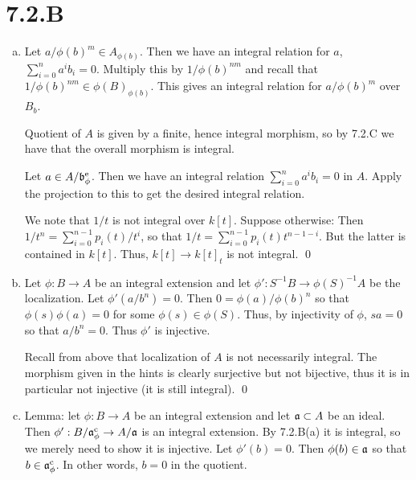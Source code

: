 \documentclass{article}
\begin{document}
\section{7.2.B}
\begin{enumerate}[a.]
    \item Let $a/\phi(b)^m \in A_{\phi(b)}$. Then we have an integral relation
          for $a$, $\sum_{i=0}^n a^ib_i=0$. Multiply this by $1/\phi(b)^{nm}$
          and recall
          that $1/\phi(b)^{nm} \in \phi(B)_{\phi(b)}$. This gives an integral
          relation
          for $a/\phi(b)^m$ over $B_b$.

          Quotient of $A$ is given by a finite, hence integral morphism, so by
          7.2.C we have that the overall morphism is integral.

          Let $a \in A/\mathfrak{b}^{\text{e}}_{\phi}$. Then we have an integral
          relation $\sum_{i=0}^n a^ib_i=0$ in $A$. Apply the projection to this
          to get
          the desired integral relation.

          We note that $1/t$ is not integral over $k[t]$. Suppose otherwise:
          Then $1/t^n=\sum_{i=0}^{n-1} p_i(t)/t^i$, so that
          $1/t=\sum_{i=0}^{n-1}
              p_i(t)t^{n-1-i}$. But the latter is contained in $k[t]$. Thus,
          $k[t] \to
              k[t]_t$ is not integral. \qed

    \item Let $\phi : B \to A$ be an integral extension and let $\phi' :
              S^{-1}B \to \phi(S)^{-1}A$ be the localization. Let
          $\phi'(a/b^n)=0$. Then
          $0=\phi(a)/\phi(b)^n$ so that $\phi(s)\phi(a)=0$ for some $\phi(s)
              \in
              \phi(S)$. Thus, by injectivity of $\phi$, $sa=0$ so that
          $a/b^n=0$. Thus
          $\phi'$ is injective.

          Recall from above that localization of $A$ is not necessarily
          integral. The morphism given in the hints is clearly surjective but
          not
          bijective, thus it is in particular not injective (it is still
          integral). \qed
    \item Lemma: let $\phi: B \to A$ be an integral extension and let $\mathfrak{a}
              \subset A$ be an ideal. Then $\phi': B/\mathfrak{a}^{\text{c}}_{\phi} \to
              A/\mathfrak{a}$ is an
          integral extension. By 7.2.B(a) it is integral, so we merely need to
          show it is
          injective. Let $\phi'(b)=0$. Then $\phi(b) \in \mathfrak{a}$ so that $b \in
              \mathfrak{a}^{\text{c}}_{\phi}$. In other words, $b = 0$ in the quotient.


\end{enumerate}
\end{document}

